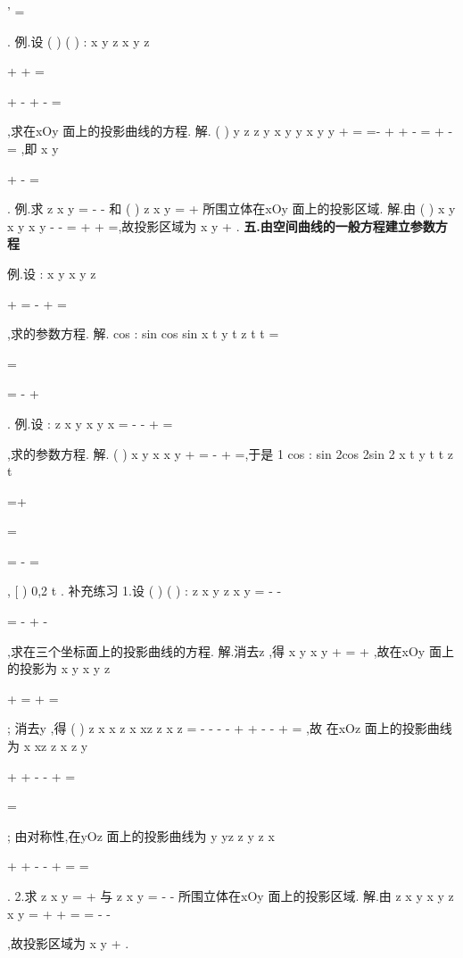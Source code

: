 '
\Gamma 
=

. 
\textcolor{lyred}{例}.设
(
)
(
)
:
x
y
z
x
y
z

+
+
=

\Gamma 
+
-
+
-
=

,求\Gamma 在xOy 面上的投影曲线的方程. 
解.
(
)
y
z
z
y
x
y
y
x
y
y
+
=\Rightarrow 
=-
\Rightarrow 
+
+
-
=\Rightarrow 
+
-
=
,即 
x
y


+
-
=




. 
\textcolor{lyred}{例}.求
z
x
y
=
-
-
和
(
)
z
x
y
=
+
所围立体在xOy 面上的投影区域. 
解.由
(
)
x
y
x
y
x
y
-
-
=
+
\Rightarrow 
+
=,故投影区域为
x
y
+
\le . 
\vspace{4pt}
{\bfseries \textcolor{lyred}{五.由空间曲线的一般方程建立参数方程}}

\textcolor{lyred}{例}.设
:
x
y
x
y
z

+
=
\Gamma -
+
=

,求\Gamma 的参数方程. 
解.
cos
:
sin
cos
sin
x
t
y
t
z
t
t
=


\Gamma 
=

=
-
+

. 
\textcolor{lyred}{例}.设
:
z
x
y
x
y
x
=
-
-
\Gamma 
+
=

,求\Gamma 的参数方程.\textcolor{lyred}{ }
解.
(
)
x
y
x
x
y
+
=
\Rightarrow 
-
+
=,于是
1 cos
:
sin
2cos
2sin 2
x
t
y
t
t
z
t

=+

\Gamma 
=


=
-
=

,
[
)
0,2
t
\pi 
\in 
. 
\textcolor{lyred}{补充练习 }
1.设
(
)
(
)
:
z
x
y
z
x
y
=
-
-

\Gamma =
-
+
-

,求\Gamma 在三个坐标面上的投影曲线的方程. 
解.消去z ,得
x
y
x
y
+
=
+
,故在xOy 面上的投影为
x
y
x
y
z

+
=
+
=

; 
消去y ,得
(
)
z
x
x
z
x
xz
z
x
z
=
-
-
-
-
\Rightarrow 
+
+
-
-
+
=
,故 
在xOz 面上的投影曲线为
x
xz
z
x
z
y

+
+
-
-
+
=

=

; 
由对称性,在yOz 面上的投影曲线为
y
yz
z
y
z
x

+
+
-
-
+
=
=

. 
2.求
z
x
y
=
+
与
z
x
y
=
-
-
所围立体在xOy 面上的投影区域. 
解.由
z
x
y
x
y
z
x
y
=
+
\Rightarrow 
+
=
=
-
-

,故投影区域为
x
y
+
\le 
. 